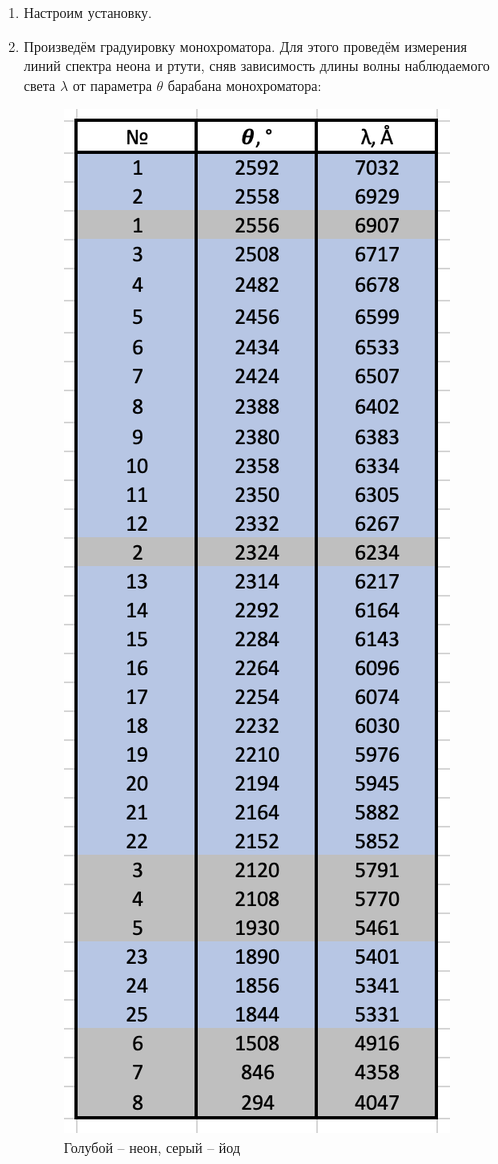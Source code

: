 \documentclass[a4paper, 12pt]{article}%
\begin{document}
\begin{enumerate}

\item Настроим установку.

\item Произведём градуировку монохроматора.  Для этого проведём измерения линий спектра неона и ртути,  сняв зависимость длины волны наблюдаемого света $\lambda$ от параметра $\theta$ барабана монохроматора:

	\begin{figure}[h!]
		\centering
		\includegraphics[scale=0.8]{Таблица_1.PNG}
		\caption{Голубой -- неон,  серый -- йод}
	\end{figure}


\end{enumerate}
\end{document}
